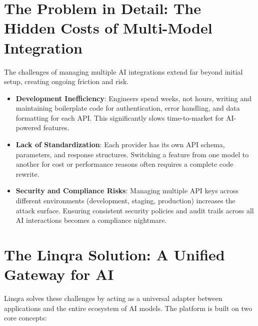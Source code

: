 \documentclass[11pt,a4paper]{article}
\begin{document}
\newpage
\section{The Problem in Detail: The Hidden Costs of Multi-Model Integration}
The challenges of managing multiple AI integrations extend far beyond initial setup, creating ongoing friction and risk.

\begin{itemize}[leftmargin=1.8em]
  \item[\textcolor{linqraprimary}{\faCode}] \textbf{Development Inefficiency}: Engineers spend weeks, not hours, writing and maintaining boilerplate code for authentication, error handling, and data formatting for each API. This significantly slows time-to-market for AI-powered features.
  \item[\textcolor{linqraprimary}{\faRandom}] \textbf{Lack of Standardization}: Each provider has its own API schema, parameters, and response structures. Switching a feature from one model to another for cost or performance reasons often requires a complete code rewrite.
  \item[\textcolor{linqraprimary}{\faLock}] \textbf{Security and Compliance Risks}: Managing multiple API keys across different environments (development, staging, production) increases the attack surface. Ensuring consistent security policies and audit trails across all AI interactions becomes a compliance nightmare.
\end{itemize}

\newpage
\section{The Linqra Solution: A Unified Gateway for AI}
Linqra solves these challenges by acting as a universal adapter between applications and the entire ecosystem of AI models. The platform is built on two core concepts:
\end{document}
